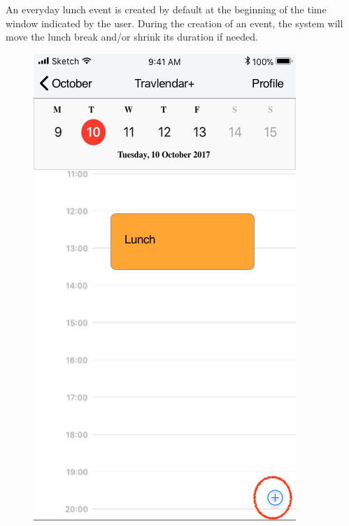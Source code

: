 \newpage
{}
An everyday lunch event is created by default at the beginning of the time window indicated by the user. During the creation of an event, the system will move the lunch break and/or shrink its duration if needed.
\begin{figure}[H]
	\centering
	\includegraphics[scale=0.23]{Images/Interface/Lunch/1_calendar+lunch}
	\hspace{0.5cm}

\end{figure}
